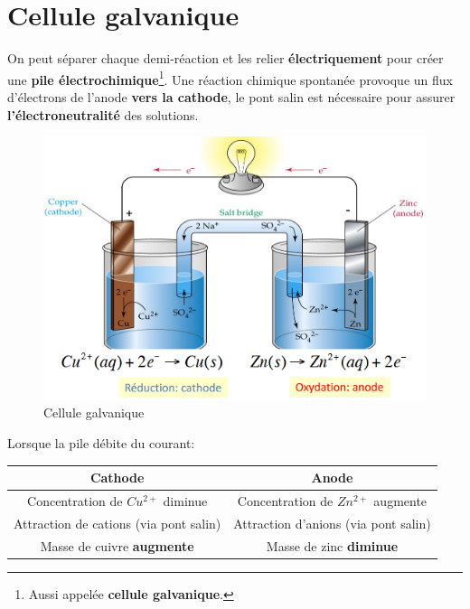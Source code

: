 \documentclass[10pt,a4paper]{book}
\begin{document}
\section{Cellule galvanique}

On peut séparer chaque demi-réaction et les relier \textbf{électriquement} pour créer une \textbf{pile électrochimique}\footnote{Aussi appelée \textbf{cellule galvanique}.}.
Une réaction chimique spontanée provoque un flux d’électrons de l'anode \textbf{vers la cathode}, le pont salin est nécessaire pour assurer \textbf{l’électroneutralité} des solutions.
\begin{figure}[h!]
\begin{center}
\includegraphics[scale=0.75]{./assets/cellule_galvanique.png}
\end{center}
\caption{Cellule galvanique}
\label{fig:galv_cell}
\end{figure}
Lorsque la pile débite du courant: \\
\begin{center}
\begin{tabular}{| c | c |}
\hline
\textbf{Cathode} & \textbf{Anode} \\
\hline
Concentration de $Cu^{2+}$ diminue & Concentration de $Zn^{2+}$ augmente \\
\hline
Attraction de cations (via pont salin) & Attraction d’anions (via pont salin) \\
\hline
Masse de cuivre \textbf{augmente} & Masse de zinc \textbf{diminue} \\
\hline
\end{tabular}
\end{center}
\end{document}
